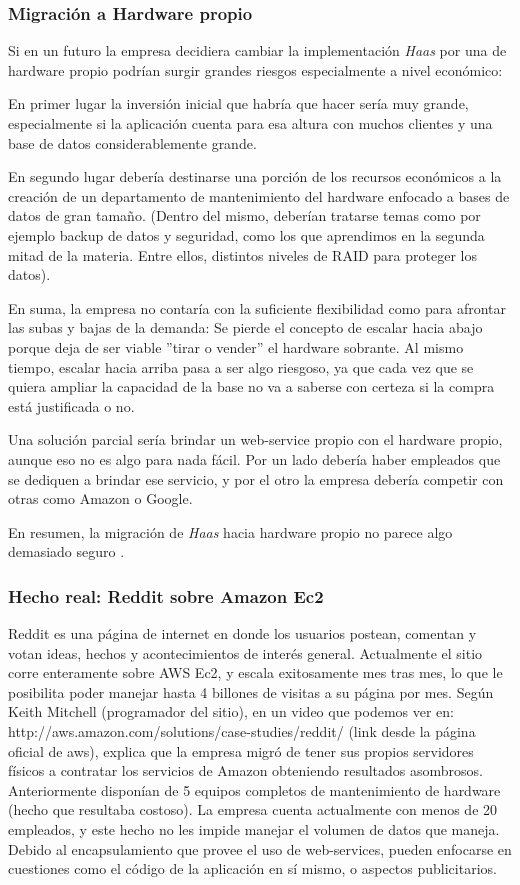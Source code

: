 \subsubsection{Migración a Hardware propio}

Si en un futuro la empresa decidiera cambiar la implementación \emph{Haas} por una de hardware propio podrían surgir 
grandes riesgos especialmente a nivel económico:

En primer lugar la inversión inicial que habría que hacer sería muy grande, especialmente si la aplicación cuenta para
esa altura con muchos clientes y una base de datos considerablemente grande.

En segundo lugar debería destinarse una porción de los recursos económicos a la creación de un departamento de
mantenimiento del hardware enfocado a bases de datos de gran tama\~no. (Dentro del mismo, deberían tratarse temas
como por ejemplo backup de datos y seguridad, como los que aprendimos en la segunda mitad de la materia. Entre
ellos, distintos niveles de RAID para proteger los datos).

En suma, la empresa no contaría con la suficiente flexibilidad como para afrontar las subas y bajas de la demanda:
Se pierde el concepto de escalar hacia abajo porque deja de ser viable ''tirar o vender'' el hardware sobrante.
Al mismo tiempo, escalar hacia arriba pasa a ser algo riesgoso, ya que cada vez que se quiera ampliar la capacidad
de la base no va a saberse con certeza si la compra está justificada o no.

Una solución parcial sería brindar un web-service propio con el hardware propio, aunque eso no es algo para nada fácil.
Por un lado debería haber empleados que se dediquen a brindar ese servicio, y por el otro la empresa debería competir
con otras como Amazon o Google.

En resumen, la migración de \emph{Haas} hacia hardware propio no parece algo demasiado seguro .


\subsubsection{Hecho real: Reddit sobre Amazon Ec2}

Reddit es una página de internet en donde los usuarios postean, comentan y votan
ideas, hechos y acontecimientos de interés general. Actualmente el sitio corre enteramente sobre AWS Ec2, y escala
exitosamente mes tras mes, lo que le posibilita poder manejar hasta 4 billones de visitas a su página por mes.
Según Keith Mitchell (programador del sitio), en un video que podemos ver en: 
http://aws.amazon.com/solutions/case-studies/reddit/ (link desde la página oficial de aws), explica que 
la empresa migró de tener sus propios servidores físicos a contratar los servicios de Amazon obteniendo resultados
asombrosos. Anteriormente disponían de 5 equipos completos de mantenimiento de hardware (hecho que resultaba
costoso). La empresa cuenta actualmente con menos de 20 empleados, y este hecho no les impide manejar el volumen de
datos que maneja. Debido al encapsulamiento que provee el uso de web-services,
pueden enfocarse en cuestiones como el código de la aplicación en sí mismo, o aspectos publicitarios.

